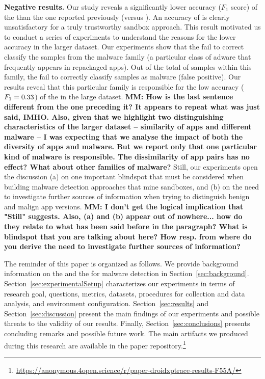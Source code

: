 {\bf Negative results.} Our study reveals a significantly lower
accuracy ($F_1$ score) of the \mas than the one reported previously (\fscore versus \fscoreSmall). 
An accuracy of \fscore is clearly unsatisfactory for a truly trustworthy sandbox approach.
This result motivated us to conduct a series of experiments 
to understand the reasons for the lower accuracy in the larger dataset.
Our experiments show that the \mas fail to correct classify the samples
from the {\color{red}\gps malware family} (a particular class of adware that frequently appears in repackaged apps). Out of the total of \appsGps samples within this family,
the \mas fail to correctly classify \appsGpsFN samples as malware (false positive). 
Our results reveal that this particular family is
responsible for the low accuracy ($F_1 = 0.33$) of the \mas in the large dataset. 
{\bf MM: How is the last sentence different from the one preceding it? It appears to repeat what was just said, IMHO. Also, given that we highlight two distinguishing characteristics of the larger dataset -- similarity of apps and different malware -- I was expecting that we analyse the impact of both the diversity of apps and malware. But we report only that one particular kind of malware is responsible. The dissimilarity of app pairs has no effect? What about other families of malware?}
%
Still, 
our experiments open the discussion (a) on one important blindspot that must be considered when building 
malware detection approaches that mine sandboxes, and (b) on the need to investigate further sources of
information when trying to distinguish benign and malign app versions.
{\bf MM: I don't get the logical implication that "Still" suggests. Also, (a) and (b) appear out of nowhere... how do they relate to what has been said before in the paragraph? What is blindspot that you are talking about here? How resp. from where do you derive the need to investigate further sources of information?}

The reminder of this paper is organized as follows. 
We provide background information on the \mas and the \mas for malware detection in
Section~\ref{sec:background}. Section~\ref{sec:experimentalSetup}
characterizes our experiments in terms of research goal, questions, metrics, datasets, procedures for collection and data analysis, and environment configuration. Section~\ref{sec:results} and Section~\ref{sec:discussion} present the main findings of our experiments and possible threats to the validity of our results. Finally,
Section~\ref{sec:conclusions} presents concluding remarks and possible future
work. The main artifacts we produced during this research are available in the
paper repository.\footnote{\url{https://anonymous.4open.science/r/paper-droidxptrace-results-F55A/}}
